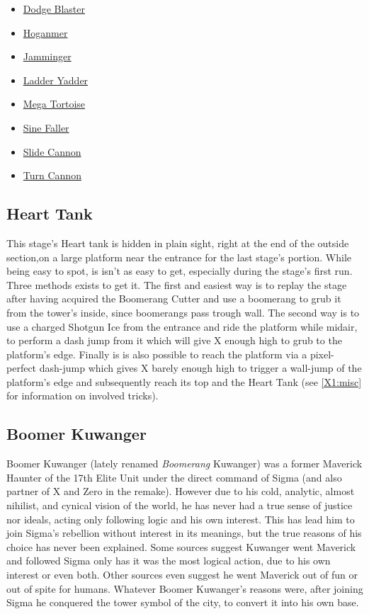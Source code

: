 \begin{itemize}
	\item \hyperlink{enem:Dodge_Blaster}{Dodge Blaster}
	\item \hyperlink{enem:Hoganmer}{Hoganmer}
	\item \hyperlink{enem:Jamminger}{Jamminger}
	\item \hyperlink{enem:Ladder_Yadder}{Ladder Yadder}
	\item \hyperlink{enem:Mega_Tortoise}{Mega Tortoise}
	\item \hyperlink{enem:Sine_Faller}{Sine Faller}
	\item \hyperlink{enem:Slide_Cannon}{Slide Cannon}
	\item \hyperlink{enem:Turn_Cannon}{Turn Cannon}
\end{itemize}

\subsection{Heart Tank}
This stage's Heart tank is hidden in plain sight, right at the end of the outside section,on a large platform near the entrance for the last stage's portion. While being easy to spot, is isn't as easy to get, especially during the stage's first run. Three methods exists to get it. The first and easiest way is to replay the stage after having acquired the Boomerang Cutter and use a boomerang to grub it from the tower's inside, since boomerangs pass trough wall. The second way is to use a charged Shotgun Ice from the entrance and ride the platform while midair, to perform a dash jump from it which will give X enough high to grub to the platform's edge. Finally is is also possible to reach the platform via a pixel-perfect dash-jump which gives X barely enough high to trigger a wall-jump of the platform's edge and subsequently reach its top and the Heart Tank (see \ref{X1:misc} for information on involved tricks).

\subsection{Boomer Kuwanger}\label{boss:Boomerang_Kuwanger}
Boomer Kuwanger (lately renamed \emph{Boomerang} Kuwanger) was a former Maverick Haunter of the 17th Elite Unit under the direct command of Sigma (and also partner of X and Zero in the \mhx remake). However due to his cold, analytic, almost nihilist\cite{book:MH_field_guide}, and cynical vision of the world, he has never had a true sense of justice nor ideals, acting only following logic and his own interest\cite{MHX:manual}. This has lead him to join Sigma's rebellion without interest in its meanings, but the true reasons of his choice has never been explained. Some sources suggest Kuwanger went Maverick and followed Sigma only has it was the most logical action\cite{MHX:manual}, due to his own interest\cite{wiki:Boomer_kuwanger} or even both\cite{book:MH_field_guide}. Other sources even suggest he went Maverick out of fun\cite{Xcoll1:Manual_X1} or out of spite for humans\cite{wayback:X_resources}. Whatever Boomer Kuwanger's reasons were, after joining Sigma he conquered the tower symbol of the city, to convert it into his own base.

